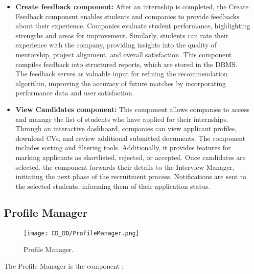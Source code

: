 \begin{itemize}
    \item \textbf{Create feedback component:} After an internship is completed, the Create Feedback component enables students and companies to provide feedbacks about their experience. Companies evaluate student performance, highlighting strengths and areas for improvement. Similarly, students can rate their experience with the company, providing insights into the quality of mentorship, project alignment, and overall satisfaction. This component compiles feedback into structured reports, which are stored in the DBMS. The feedback serves as valuable input for refining the recommendation algorithm, improving the accuracy of future matches by incorporating performance data and user satisfaction.
    \item \textbf{View Candidates component:} This component allows companies to access and manage the list of students who have applied for their internships. Through an interactive dashboard, companies can view applicant profiles, download CVs, and review additional submitted documents. The component includes sorting and filtering tools. Additionally, it provides features for marking applicants as shortlisted, rejected, or accepted. Once candidates are selected, the component forwards their details to the Interview Manager, initiating the next phase of the recruitment process. Notifications are sent to the selected students, informing them of their application status.
\end{itemize}

\subsection{Profile Manager}
\label{subsec:profile_manager}%

\begin{figure}[H]
    \begin{center}
        \texttt{[image: CD\_DD/ProfileManager.png]}
        \caption{Profile Manager.}
        \label{fig:profile_manager}%
    \end{center}
\end{figure}

\noindent The Profile Manager is the component :

